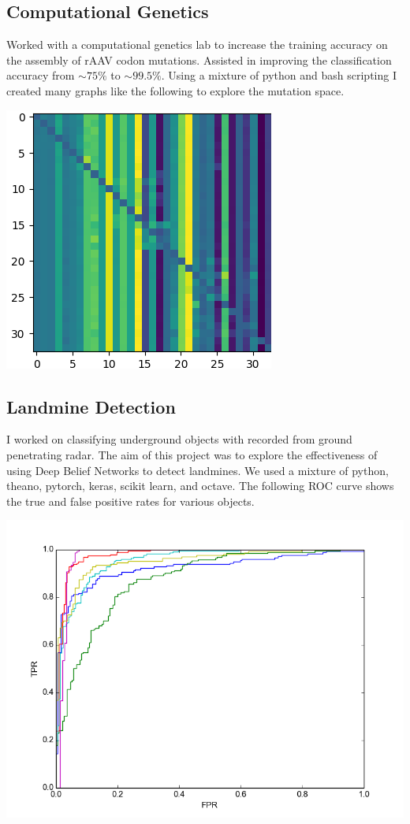 \documentclass[../resume.tex]{subfiles}
\begin{document}
\subsection{Computational Genetics}
Worked with a computational genetics lab to increase the training accuracy on the assembly of rAAV codon mutations.  Assisted in improving the classification accuracy from $\sim 75\%$ to $\sim 99.5\%$.  Using a mixture of python and bash scripting I created many graphs like the following to explore the mutation space.

\includegraphics[scale=0.5]{../research/sum_modes_RAmRU.png} 

\subsection{Landmine Detection}

I worked on classifying underground objects with recorded from ground penetrating radar.  The aim of this project was to explore the effectiveness of using Deep Belief Networks to detect landmines.  We used a mixture of python, theano, pytorch, keras, scikit learn, and octave.  The following ROC curve shows the true and false positive rates for various objects.

\includegraphics[scale=0.5]{../research/roc.png}
\end{document}
